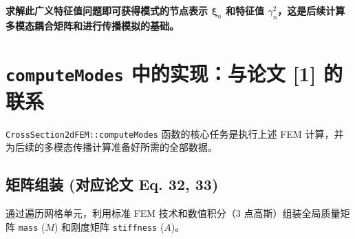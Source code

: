 \documentclass{ctexart}
\begin{document}
\textbf{求解此广义特征值问题即可获得模式的节点表示 $\boldsymbol{\xi}_n$ 和特征值 $\gamma_n^2$，这是后续计算多模态耦合矩阵和进行传播模拟的基础。}

\section{\texttt{computeModes} 中的实现：与论文 [1] 的联系}

\texttt{CrossSection2dFEM::computeModes} 函数的核心任务是执行上述 FEM 计算，并为后续的多模态传播计算准备好所需的全部数据。

\subsection{矩阵组装 (对应论文 Eq. 32, 33)}
通过遍历网格单元，利用标准 FEM 技术和数值积分（3 点高斯）组装全局质量矩阵 \texttt{mass} ($M$) 和刚度矩阵 \texttt{stiffness} ($A$)。
\end{document}
